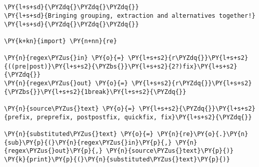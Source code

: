 

\section*{}

\begin{Verbatim}[commandchars=\\\{\}]
\PY{l+s+sd}{\PYZdq{}\PYZdq{}\PYZdq{}}
\PY{l+s+sd}{Bringing grouping, extraction and alternatives together!}
\PY{l+s+sd}{\PYZdq{}\PYZdq{}\PYZdq{}}

\PY{k+kn}{import} \PY{n+nn}{re}

\PY{n}{regex\PYZus{}in} \PY{o}{=} \PY{l+s+s2}{r\PYZdq{}}\PY{l+s+s2}{((pre|post)}\PY{l+s+s2}{\PYZbs{}}\PY{l+s+s2}{2?)fix}\PY{l+s+s2}{\PYZdq{}}
\PY{n}{regex\PYZus{}out} \PY{o}{=} \PY{l+s+s2}{r\PYZdq{}}\PY{l+s+s2}{\PYZbs{}}\PY{l+s+s2}{1break}\PY{l+s+s2}{\PYZdq{}}

\PY{n}{source\PYZus{}text} \PY{o}{=} \PY{l+s+s2}{\PYZdq{}}\PY{l+s+s2}{prefix, preprefix, postpostfix, quickfix, fix}\PY{l+s+s2}{\PYZdq{}}

\PY{n}{substituted\PYZus{}text} \PY{o}{=} \PY{n}{re}\PY{o}{.}\PY{n}{sub}\PY{p}{(}\PY{n}{regex\PYZus{}in}\PY{p}{,} \PY{n}{regex\PYZus{}out}\PY{p}{,} \PY{n}{source\PYZus{}text}\PY{p}{)}
\PY{k}{print}\PY{p}{(}\PY{n}{substituted\PYZus{}text}\PY{p}{)}
\end{Verbatim}

